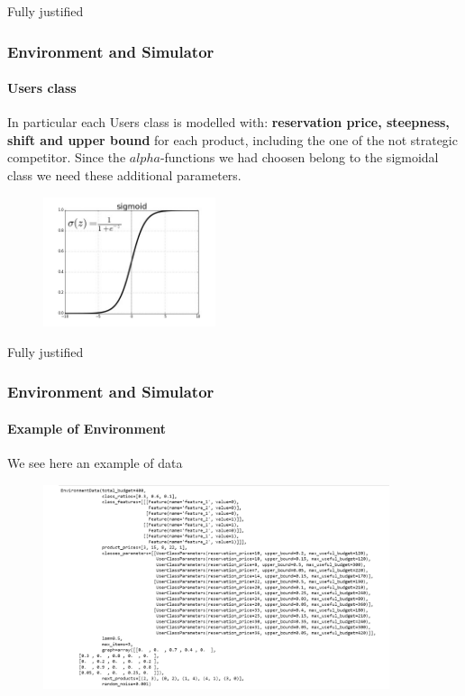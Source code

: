 \documentclass{beamer}
\begin{document}
\begin {frame}{Fully justified}

\frametitle{Environment and Simulator}
\framesubtitle{Users class}

In particular each Users class is modelled with:\textbf{ reservation price, steepness, shift and upper bound}
for each product, including the one of the not strategic competitor.
Since the $alpha$-functions we had choosen belong to the sigmoidal class we need these additional parameters.

\begin{figure}[⟨r⟩]  
\includegraphics[height=3.8cm]{img/Graphs/sigmoid.png}
    \end{figure}
\end {frame}


\begin{frame}{Fully justified}

    \frametitle{Environment and Simulator}
    \framesubtitle{Example of Environment}

We see here an example of data     
      \begin{figure}[⟨t⟩]  
        \includegraphics[height=6cm]{img/Graphs/Example_environment.png}
            \end{figure}

\end {frame}
\end{document}
